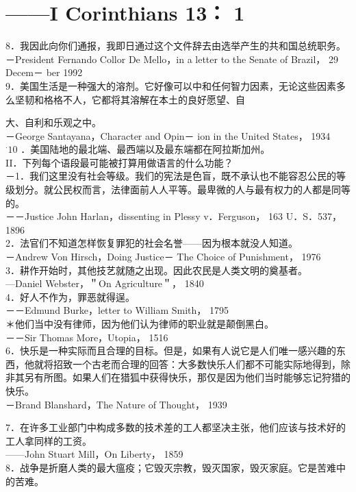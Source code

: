 \section*{——I Corinthians 13： 1}
8．我因此向你们通报，我即日通过这个文件辞去由选举产生的共和国总统职务。\\
－President Fernando Collor De Mello，in a letter to the Senate of Brazil， 29 Decem－ ber 1992\\
9．美国生活是一种强大的溶剂。它好像可以中和任何智力因素，无论这些因素多么坚韧和格格不人，它都将其溶解在本土的良好愿望、自

大、自利和乐观之中。\\
－George Santayana，Character and Opin－ ion in the United States， 1934\\
${ }^{\cdot} 10$ ．美国陆地的最北端、最西端以及最东端都在阿拉斯加州。\\
II．下列每个语段最可能被打算用做语言的什么功能？\\
－1．我们这里没有社会等级。我们的宪法是色盲，既不承认也不能容忍公民的等级划分。就公民权而言，法律面前人人平等。最卑微的人与最有权力的人都是同等的。\\
－－Justice John Harlan，dissenting in Plessy v．Ferguson， 163 U．S．537， 1896\\
2．法官们不知道怎样恢复罪犯的社会名誉——因为根本就没人知道。\\
－Andrew Von Hirsch，Doing Justice－ The Choice of Punishment， 1976\\
3．耕作开始时，其他技艺就随之出现。因此农民是人类文明的奠基者。\\
—Daniel Webster，＂On Agriculture＂， 1840\\
4．好人不作为，罪恶就得逞。\\
－－Edmund Burke，letter to William Smith， 1795\\
＊他们当中没有律师，因为他们认为律师的职业就是颠倒黑白。\\
－－Sir Thomas More，Utopia， 1516\\
6．快乐是一种实际而且合理的目标。但是，如果有人说它是人们唯一感兴趣的东西，他就将招致一个古老而合理的回答：大多数快乐人们都不可能实际地得到，除非其另有所图。如果人们在猎狐中获得快乐，那仅是因为他们当时能够忘记狩猎的快乐。\\
－Brand Blanshard，The Nature of Thought， 1939

7．在许多工业部门中构成多数的技术差的工人都坚决主张，他们应该与技术好的工人拿同样的工资。\\
——John Stuart Mill，On Liberty， 1859\\
8．战争是折磨人类的最大瘟疫；它毁灭宗教，毁灭国家，毁灭家庭。它是苦难中的苦难。


